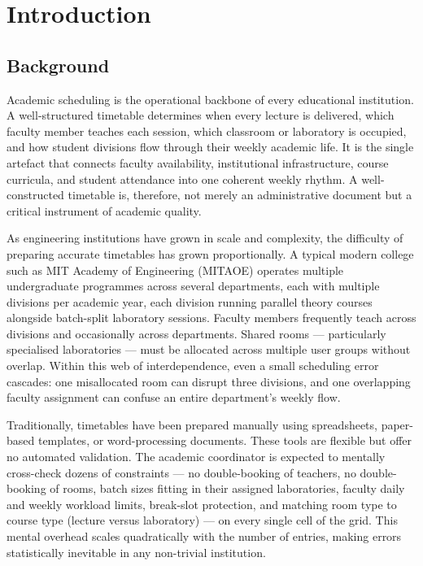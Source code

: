 \newpage
\chapter{Introduction}

\section{Background}

Academic scheduling is the operational backbone of every educational institution. A well-structured timetable determines when every lecture is delivered, which faculty member teaches each session, which classroom or laboratory is occupied, and how student divisions flow through their weekly academic life. It is the single artefact that connects faculty availability, institutional infrastructure, course curricula, and student attendance into one coherent weekly rhythm. A well-constructed timetable is, therefore, not merely an administrative document but a critical instrument of academic quality.

As engineering institutions have grown in scale and complexity, the difficulty of preparing accurate timetables has grown proportionally. A typical modern college such as MIT Academy of Engineering (MITAOE) operates multiple undergraduate programmes across several departments, each with multiple divisions per academic year, each division running parallel theory courses alongside batch-split laboratory sessions. Faculty members frequently teach across divisions and occasionally across departments. Shared rooms --- particularly specialised laboratories --- must be allocated across multiple user groups without overlap. Within this web of interdependence, even a small scheduling error cascades: one misallocated room can disrupt three divisions, and one overlapping faculty assignment can confuse an entire department's weekly flow.

Traditionally, timetables have been prepared manually using spreadsheets, paper-based templates, or word-processing documents. These tools are flexible but offer no automated validation. The academic coordinator is expected to mentally cross-check dozens of constraints --- no double-booking of teachers, no double-booking of rooms, batch sizes fitting in their assigned laboratories, faculty daily and weekly workload limits, break-slot protection, and matching room type to course type (lecture versus laboratory) --- on every single cell of the grid. This mental overhead scales quadratically with the number of entries, making errors statistically inevitable in any non-trivial institution.

